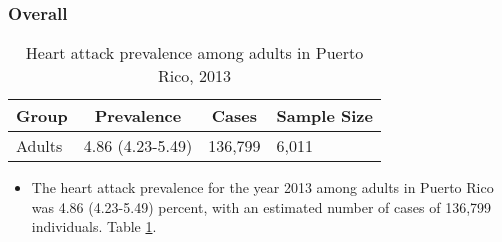 
\subsubsection{Overall}




\begin{table}[H]
\caption{Heart attack prevalence among adults in Puerto Rico, 2013\label{tab:Overall.tabl.Heart_Attack.2013}} 
\begin{center}
\begin{tabular}{llll}
\hline\hline
\multicolumn{1}{l}{Group}&\multicolumn{1}{c}{Prevalence}&\multicolumn{1}{c}{Cases}&\multicolumn{1}{c}{Sample Size}\tabularnewline
\hline
Adults&4.86 (4.23-5.49)& 136,799&6,011\tabularnewline
\hline
\end{tabular}\end{center}

\end{table}




\begin{itemize}


\item The heart attack prevalence for the year 2013 among adults in Puerto Rico was 4.86 (4.23-5.49) percent, with an estimated number of cases of 136,799 individuals.
Table \ref{tab:Overall.tabl.Heart_Attack.2013}.

\end{itemize}



